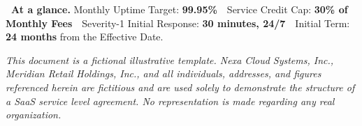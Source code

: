 \begin{slabox}
\textbf{\faFile\ At a glance.} Monthly Uptime Target: \textbf{99.95\%}\ \textbullet\ Service Credit Cap: \textbf{30\% of Monthly Fees}\ \textbullet\ Severity-1 Initial Response: \textbf{30 minutes, 24/7}\ \textbullet\ Initial Term: \textbf{24 months} from the Effective Date.
\end{slabox}

\vspace{4pt}
{\scriptsize\color{slateink}\itshape This document is a fictional illustrative template. Nexa Cloud Systems, Inc., Meridian Retail Holdings, Inc., and all individuals, addresses, and figures referenced herein are fictitious and are used solely to demonstrate the structure of a SaaS service level agreement. No representation is made regarding any real organization.}
